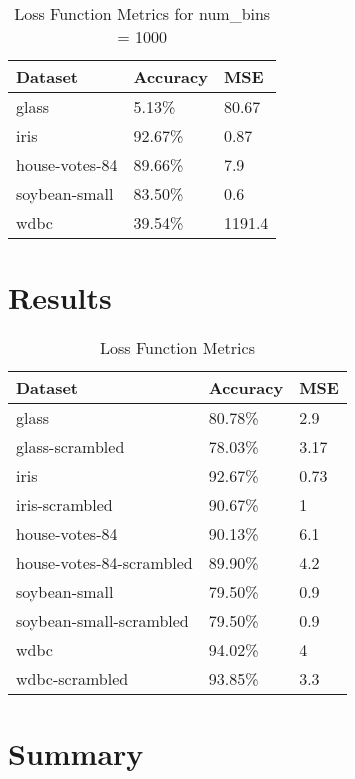 \documentclass[twoside,11pt]{article}
\begin{document}
\begin{table}[]
	\centering
	\caption{Loss Function Metrics for num\_bins = 1000} \label{tab:metrics1000}
	\begin{tabular}{|l|l|l|}
		\hline
		Dataset                  & Accuracy & MSE    \\ \hline
		glass                    & 5.13\%   & 80.67  \\ \hline
		iris                     & 92.67\%  & 0.87   \\ \hline
		house-votes-84           & 89.66\%  & 7.9    \\ \hline
		soybean-small            & 83.50\%  & 0.6    \\ \hline
		wdbc                     & 39.54\%  & 1191.4 \\ \hline
	\end{tabular}
\end{table}

\section{Results}



\begin{table}[h]
	\centering
	\caption{Loss Function Metrics} \label{tab:metrics}
	\begin{tabular}{|l|l|l|}
		\hline
		Dataset                  & Accuracy & MSE  \\ \hline
		glass                    & 80.78\%  & 2.9  \\ \hline
		glass-scrambled          & 78.03\%  & 3.17 \\ \hline
		iris                     & 92.67\%  & 0.73 \\ \hline
		iris-scrambled           & 90.67\%  & 1    \\ \hline
		house-votes-84           & 90.13\%  & 6.1  \\ \hline
		house-votes-84-scrambled & 89.90\%  & 4.2  \\ \hline
		soybean-small            & 79.50\%  & 0.9  \\ \hline
		soybean-small-scrambled  & 79.50\%  & 0.9  \\ \hline
		wdbc                     & 94.02\%  & 4    \\ \hline
		wdbc-scrambled           & 93.85\%  & 3.3  \\ \hline
	\end{tabular}
\end{table}

\section{Summary}


\end{document}
